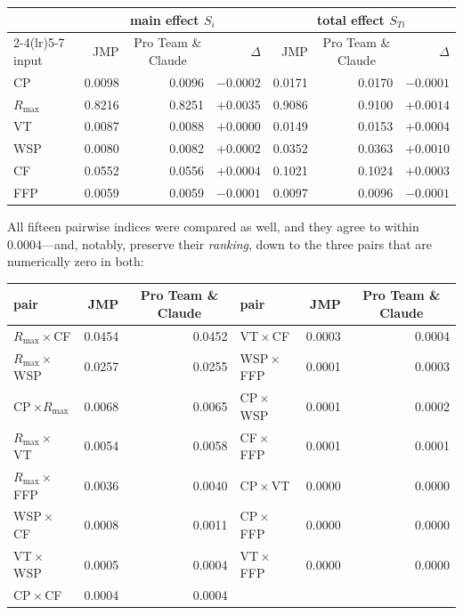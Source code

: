 \documentclass[11pt]{article}
\begin{document}
\begin{center}\small
\begin{tabular}{lrrrrrr}
\toprule
 & \multicolumn{3}{c}{main effect $S_i$} & \multicolumn{3}{c}{total effect $S_{Ti}$}\\
\cmidrule(lr){2-4}\cmidrule(lr){5-7}
input & JMP & \multicolumn{1}{c}{Pro Team \& Claude} & $\Delta$ &
        JMP & \multicolumn{1}{c}{Pro Team \& Claude} & $\Delta$\\
\midrule
CP        & 0.0098 & 0.0096 & $-0.0002$ & 0.0171 & 0.0170 & $-0.0001$\\
$R_{\max}$& 0.8216 & 0.8251 & $+0.0035$ & 0.9086 & 0.9100 & $+0.0014$\\
VT        & 0.0087 & 0.0088 & $+0.0000$ & 0.0149 & 0.0153 & $+0.0004$\\
WSP       & 0.0080 & 0.0082 & $+0.0002$ & 0.0352 & 0.0363 & $+0.0010$\\
CF        & 0.0552 & 0.0556 & $+0.0004$ & 0.1021 & 0.1024 & $+0.0003$\\
FFP       & 0.0059 & 0.0059 & $-0.0001$ & 0.0097 & 0.0096 & $-0.0001$\\
\bottomrule
\end{tabular}
\end{center}

All fifteen pairwise indices were compared as well, and they agree to within
$0.0004$---and, notably, preserve their \emph{ranking}, down to the three pairs that
are numerically zero in both:

\begin{center}\small
\begin{tabular}{lrr@{\hskip 2.5em}lrr}
\toprule
pair & JMP & \multicolumn{1}{c}{Pro Team \& Claude} &
pair & JMP & \multicolumn{1}{c}{Pro Team \& Claude}\\
\midrule
$R_{\max}\!\times\!$CF  & 0.0454 & 0.0452 & VT\,$\times$\,CF        & 0.0003 & 0.0004\\
$R_{\max}\!\times\!$WSP & 0.0257 & 0.0255 & WSP\,$\times$\,FFP      & 0.0001 & 0.0003\\
CP\,$\times R_{\max}$   & 0.0068 & 0.0065 & CP\,$\times$\,WSP       & 0.0001 & 0.0002\\
$R_{\max}\!\times\!$VT  & 0.0054 & 0.0058 & CF\,$\times$\,FFP       & 0.0001 & 0.0001\\
$R_{\max}\!\times\!$FFP & 0.0036 & 0.0040 & CP\,$\times$\,VT        & 0.0000 & 0.0000\\
WSP\,$\times$\,CF       & 0.0008 & 0.0011 & CP\,$\times$\,FFP       & 0.0000 & 0.0000\\
VT\,$\times$\,WSP       & 0.0005 & 0.0004 & VT\,$\times$\,FFP       & 0.0000 & 0.0000\\
CP\,$\times$\,CF        & 0.0004 & 0.0004 &                         &        &      \\
\bottomrule
\end{tabular}
\end{center}
\end{document}
